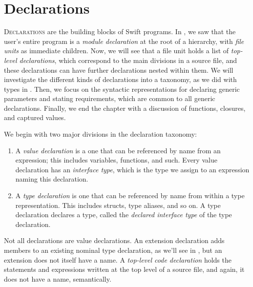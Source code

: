 \documentclass[../generics]{subfiles}
\begin{document}
\chapter{Declarations}\label{chap:decls}

\lettrine{D}{eclarations} are the building blocks of Swift programs. In , we saw that the user's entire program is a \emph{module declaration} at the root of a hierarchy, with \emph{file units} as immediate children. Now, we will see that a file unit holds a list of \emph{top-level declarations}, which correspond to the main divisions in a source file, and these declarations can have further declarations nested within them. We will investigate the different kinds of declarations into a taxonomy, as we did with types in . Then, we focus on the syntactic representations for declaring generic parameters and stating requirements, which are common to all generic declarations. Finally, we end the chapter with a discussion of functions, closures, and captured values.

We begin with two major divisions in the declaration taxonomy:
\begin{enumerate}
\item A \emph{value declaration} is a one that can be referenced by name from an expression; this includes variables, functions, and such. Every value declaration has an \emph{interface type}, which is the type we assign to an expression naming this declaration.
\item A \emph{type declaration} is one that can be referenced by name from within a type representation. This includes structs, type aliases, and so on. A type declaration declares a type, called the \emph{declared interface type} of the type declaration.
\end{enumerate}
Not all declarations are value declarations. An extension declaration adds members to an existing nominal type declaration, as we'll see in , but an extension does not itself have a name. A \emph{top-level code declaration} holds the statements and expressions written at the top level of a source file, and again, it does not have a name, semantically.
\end{document}
